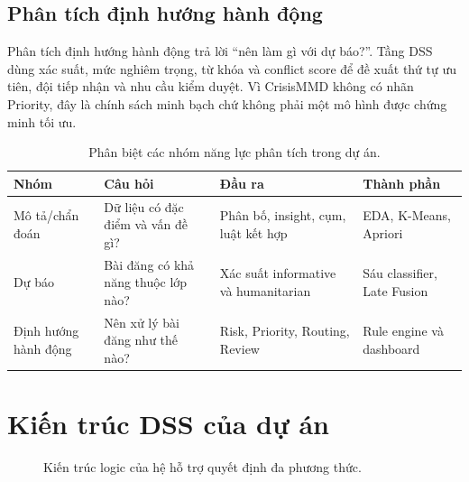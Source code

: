 \subsection{Phân tích định hướng hành động}

Phân tích định hướng hành động trả lời ``nên làm gì với dự báo?''. Tầng DSS
dùng xác suất, mức nghiêm trọng, từ khóa và conflict score để đề xuất thứ tự
ưu tiên, đội tiếp nhận và nhu cầu kiểm duyệt. Vì CrisisMMD không có nhãn
Priority, đây là chính sách minh bạch chứ không phải một mô hình được chứng
minh tối ưu.

\begin{table}[H]
\centering
\small
\caption{Phân biệt các nhóm năng lực phân tích trong dự án.}
\begin{tabularx}{\textwidth}{p{3.1cm}p{4.3cm}XX}
\toprule
\textbf{Nhóm} & \textbf{Câu hỏi} & \textbf{Đầu ra} & \textbf{Thành phần}\\
\midrule
Mô tả/chẩn đoán & Dữ liệu có đặc điểm và vấn đề gì? &
Phân bố, insight, cụm, luật kết hợp & EDA, K-Means, Apriori\\
Dự báo & Bài đăng có khả năng thuộc lớp nào? &
Xác suất informative và humanitarian & Sáu classifier, Late Fusion\\
Định hướng hành động & Nên xử lý bài đăng như thế nào? &
Risk, Priority, Routing, Review & Rule engine và dashboard\\
\bottomrule
\end{tabularx}
\end{table}

\section{Kiến trúc DSS của dự án}

\begin{figure}[H]
\centering
{}
\caption{Kiến trúc logic của hệ hỗ trợ quyết định đa phương thức.}
\end{figure}


